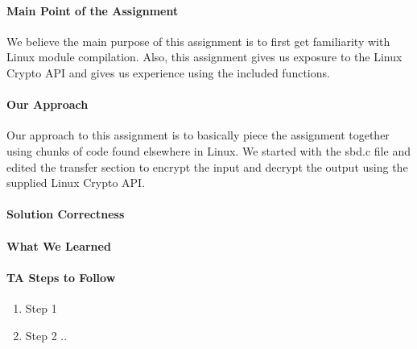 \documentclass[titlepage,draftclsnofoot,onecolumn]{article}
\begin{document}
\paragraph{Main Point of the Assignment}
We believe the main purpose of this assignment is to first get familiarity with Linux module compilation. Also, this assignment gives us exposure to the Linux Crypto API and gives us experience using the included functions.

\paragraph{Our Approach}
Our approach to this assignment is to basically piece the assignment together using chunks of code found elsewhere in Linux. We started with the sbd.c file and edited the transfer section to encrypt the input and decrypt the output using the supplied Linux Crypto API.

\paragraph{Solution Correctness}


\paragraph{What We Learned}


\paragraph{TA Steps to Follow}


\begin{enumerate}
  \item Step 1
  \item Step 2 ..
\end{enumerate}
\end{document}
